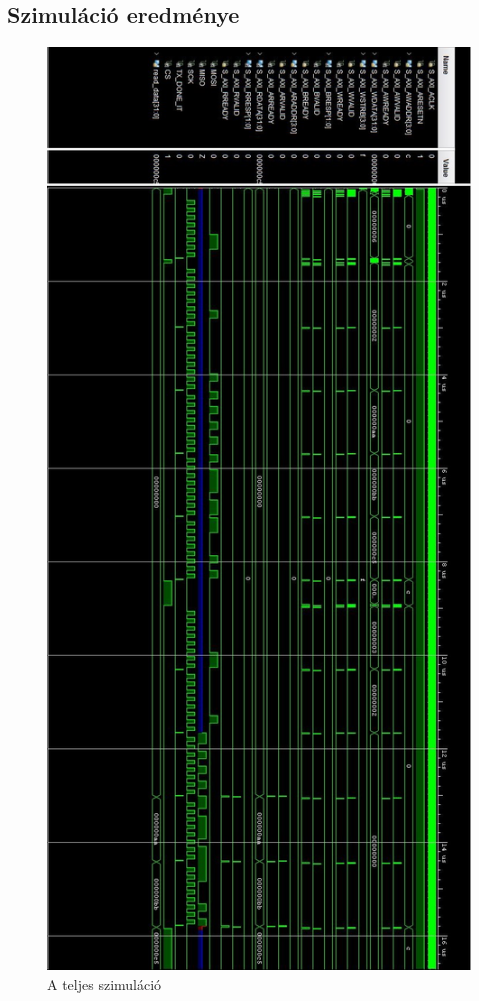 \documentclass[a4paper,11pt]{article}
\begin{document}
\subsection{Szimuláció eredménye}

\begin{figure}[h!]
	\begin{center}
	\includegraphics[scale=0.6]{sim_complete.JPG}
	\caption{A teljes szimuláció}
	\label{fig:sim_complete}
	\end{center}
\end{figure}
\end{document}
